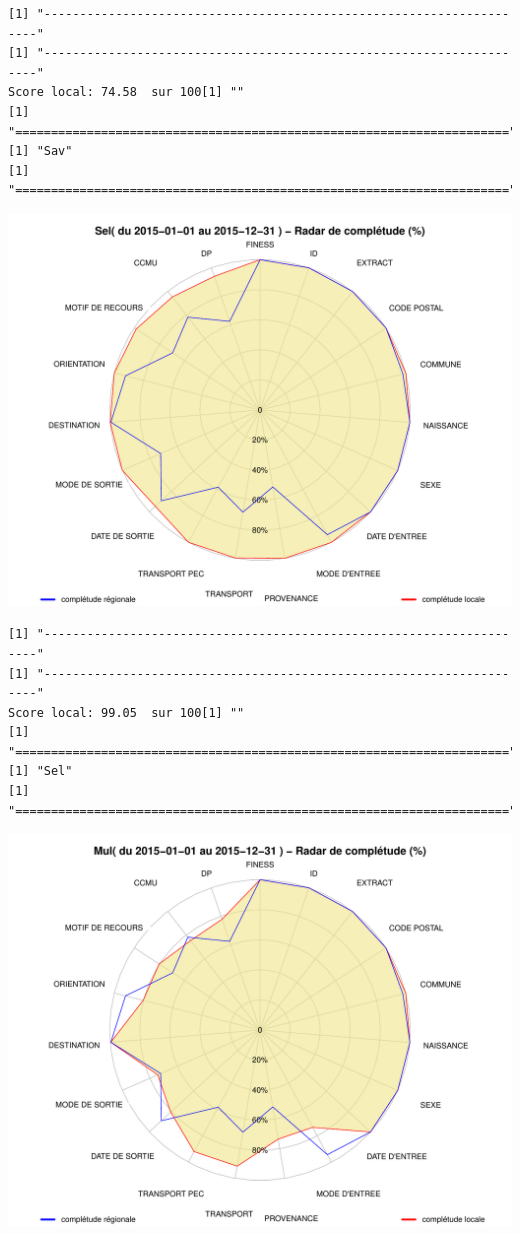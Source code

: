 \documentclass[]{article}
\begin{document}
\begin{verbatim}
[1] "---------------------------------------------------------------------"
[1] "---------------------------------------------------------------------"
Score local: 74.58  sur 100[1] ""
[1] "====================================================================="
[1] "Sav"
[1] "====================================================================="
\end{verbatim}

\includegraphics{completude_files/figure-latex/finess-2.pdf}

\begin{verbatim}
[1] "---------------------------------------------------------------------"
[1] "---------------------------------------------------------------------"
Score local: 99.05  sur 100[1] ""
[1] "====================================================================="
[1] "Sel"
[1] "====================================================================="
\end{verbatim}

\includegraphics{completude_files/figure-latex/finess-3.pdf}
\end{document}
